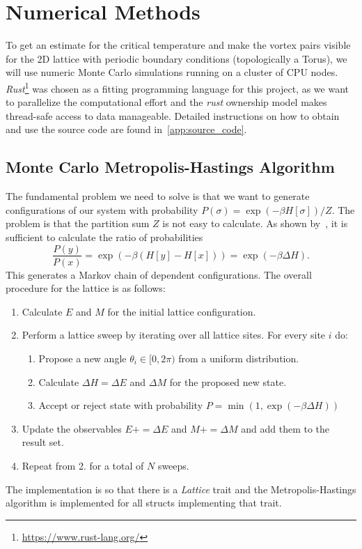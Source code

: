 \section{Numerical Methods}
To get an estimate for the critical temperature and make the vortex pairs visible for the 2D lattice with periodic boundary conditions (topologically a Torus), we will use numeric Monte Carlo simulations running on a cluster of CPU nodes. \emph{Rust}\footnote{\url{https://www.rust-lang.org/}} was chosen as a fitting programming language for this project, as we want to parallelize the computational effort and the \emph{rust} ownership model makes thread-safe access to data manageable. Detailed instructions on how to obtain and use the source code are found in~\cref{app:source_code}.

\subsection{Monte Carlo Metropolis-Hastings Algorithm}\label{sec:metropolis_hastings}
The fundamental problem we need to solve is that we want to generate configurations of our system with probability $P(\sigma) = \exp{(-\beta H[\sigma])}/Z$. The problem is that the partition sum $Z$ is not easy to calculate. As shown by~\citet{metropolis}, it is sufficient to calculate the ratio of probabilities
\begin{equation}
	\frac{P(y)}{P(x)} = \exp{(-\beta(H[y] - H[x]))} = \exp{(-\beta \Delta H)}.
\end{equation}
This generates a Markov chain of dependent configurations. The overall procedure for the lattice is as follows:
\begin{enumerate}
	\item Calculate $E$ and $M$ for the initial lattice configuration.
	\item Perform a lattice sweep by iterating over all lattice sites. For every site $i$ do:
	\begin{enumerate}
		\item Propose a new angle $\theta_i \in [0,2\pi)$ from a uniform distribution.
		\item Calculate $\Delta H = \Delta E$ and $\Delta M$ for the proposed new state.
		\item Accept or reject state with probability $P = \min{(1, \exp{(-\beta\Delta H)})}$
	\end{enumerate}
	\item Update the observables $E \mathrel{{+}{=}} \Delta E$ and $M \mathrel{{+}{=}} \Delta M$ and add them to the result set.
	\item Repeat from 2. for a total of $N$ sweeps.
\end{enumerate}
The implementation is so that there is a \textit{Lattice} trait and the Metropolis-Hastings algorithm is implemented for all structs implementing that trait.

